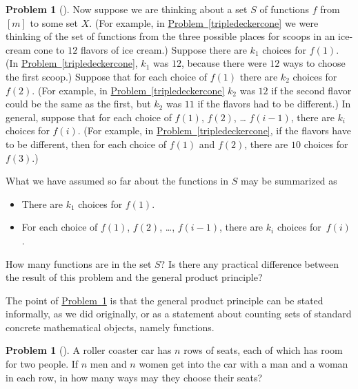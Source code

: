 \documentclass[10pt,]{book}
\theoremstyle{plain}
\theoremstyle{definition}
\newtheorem{activity}[project]{Problem}
\theoremstyle{definition}
\numberwithin{equation}{chapter}
\newcommand{\importantarrow}{\Rightarrow}
\begin{document}
\begin{activity}[] \label{generalproductprinciple}
Now suppose we are thinking about a set \(S\) of functions \(f\) from \([m]\) to some set \(X\). (For example, in \hyperref[tripledeckercone]{Problem~\ref{tripledeckercone}} we were thinking of the set of functions from the three possible places for scoops in an ice-cream cone to \(12\) flavors of ice cream.) Suppose there are \(k_1\) choices for \(f(1)\). (In \hyperref[tripledeckercone]{Problem~\ref{tripledeckercone}}, \(k_1\) was \(12\), because there were \(12\) ways to choose the first scoop.) Suppose that for each choice of \(f(1)\) there are \(k_2\) choices for \(f(2)\). (For example, in \hyperref[tripledeckercone]{Problem~\ref{tripledeckercone}} \(k_2\) was \(12\) if the second flavor could be the same as the first, but \(k_2\) was \(11\) if the flavors had to be different.) In general, suppose that for each choice of \(f(1)\), \(f(2)\), \dots{} \(f(i-1)\), there are \(k_i\) choices for \(f(i)\). (For example, in \hyperref[tripledeckercone]{Problem~\ref{tripledeckercone}}, if the flavors have to be different, then for each choice of \(f(1)\) and \(f(2)\), there are \(10\) choices for \(f(3)\).)%
\par
What we have assumed so far about the functions in \(S\) may be summarized as \leavevmode%
\begin{itemize}[label=\textbullet]
\item{}There are \(k_1\) choices for \(f(1)\).%
\item{}For each choice of \(f(1)\), \(f(2)\), \dots{}, \(f(i-1)\), there are \(k_i\) choices for~\(f(i)\).%
\end{itemize}
%
\par
How many functions are in the set \(S\)? Is there any practical difference between the result of this problem and the general product principle?%
\end{activity}
The point of \hyperref[generalproductprinciple]{Problem~\ref{generalproductprinciple}} is that the general product principle can be stated informally, as we did originally, or as a statement about counting sets of standard concrete mathematical objects, namely functions.%
\begin{activity}[]\marginsymbol[-1em]{\pdftooltip{$\importantarrow$}{especially interesting}} \label{activity-15}
A roller coaster car has \(n\) rows of seats, each of which has room for two people. If \(n\) men and \(n\) women get into the car with a man and a woman in each row, in how many ways may they choose their seats?%
\end{activity}
\end{document}

